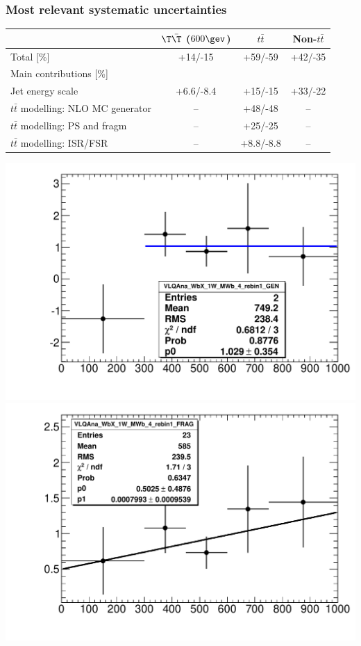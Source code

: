 \begin{frame}\frametitle{Most relevant systematic uncertainties}
\centering\footnotesize

\begin{tabular}{l*{3}{c}}
\toprule
 & $\T\bar{\T}$ ($600\gev$) & $t\bar{t}$ & Non-$t\bar{t}$\\
\midrule
Total [\%] & +14/-15 & +59/-59 & +42/-35\\
\midrule
Main contributions [\%] &&&\\
Jet energy scale & +6.6/-8.4 & +15/-15 & +33/-22\\  
$t\bar{t}$ modelling: NLO MC generator & -- & +48/-48 & --\\  
$t\bar{t}$ modelling: PS and fragm & -- & +25/-25 & --\\  
$t\bar{t}$ modelling: ISR/FSR & -- & +8.8/-8.8 & --\\   
\bottomrule
\end{tabular}

\includegraphics[width=.33\textwidth]{pics/GEN_RATIO.pdf}
\includegraphics[width=.33\textwidth]{pics/FRAG_RATIO.pdf}


\end{frame}

